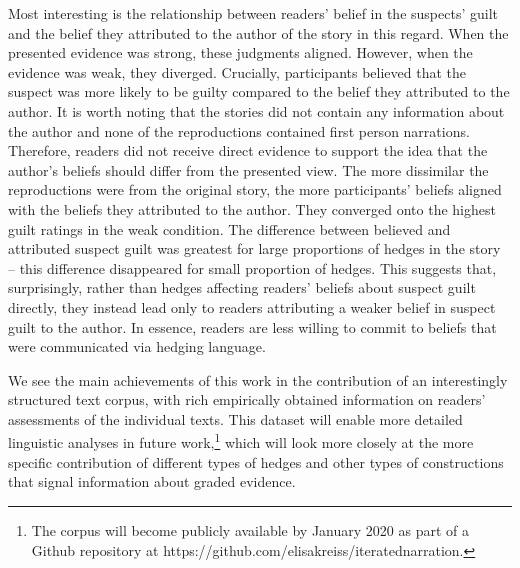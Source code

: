 \documentclass[10pt,letterpaper]{article}
\begin{document}
Most interesting is the relationship between readers' belief in the suspects'  guilt and the belief they attributed to the author of the story in this regard. When the presented evidence was strong, these judgments aligned. However, when the evidence was weak, they diverged. Crucially, participants believed that the suspect was more likely to be guilty compared to the belief they attributed to the author. It is worth noting that the stories did not contain any information about the author and none of the reproductions contained first person narrations. Therefore, readers did not receive direct evidence to support the idea that the author's beliefs should differ from the presented view. The more dissimilar the reproductions were from the original story, the more participants' beliefs aligned with the beliefs they attributed to the author. They converged onto the highest guilt ratings in the weak condition.
The difference between believed and attributed suspect guilt was greatest for large proportions of hedges in the story – this difference disappeared for small proportion of hedges. This suggests that, surprisingly, rather than hedges affecting readers' beliefs about suspect guilt directly, they instead lead only to readers attributing a weaker belief in suspect guilt to the author. In essence, readers are less willing to commit to beliefs that were communicated via hedging language.

We see the main achievements of this work in the contribution of an interestingly structured text corpus, with rich empirically obtained information on readers' assessments of the individual texts. This dataset will enable more detailed linguistic analyses in future work,\footnote{The corpus will become publicly available by January 2020 as part of a Github repository at https://github.com/elisakreiss/iteratednarration.} which will look more closely at the more specific contribution of different types of hedges and other types of constructions that signal information about graded evidence.
\end{document}
